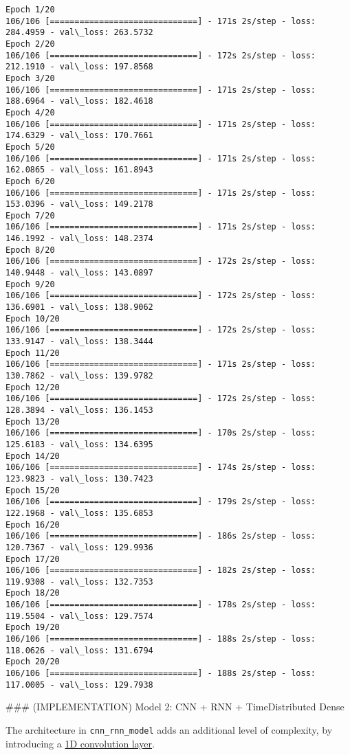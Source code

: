 \documentclass[11pt]{article}
\begin{document}
    \begin{Verbatim}[commandchars=\\\{\}]
Epoch 1/20
106/106 [==============================] - 171s 2s/step - loss: 284.4959 - val\_loss: 263.5732
Epoch 2/20
106/106 [==============================] - 172s 2s/step - loss: 212.1910 - val\_loss: 197.8568
Epoch 3/20
106/106 [==============================] - 171s 2s/step - loss: 188.6964 - val\_loss: 182.4618
Epoch 4/20
106/106 [==============================] - 171s 2s/step - loss: 174.6329 - val\_loss: 170.7661
Epoch 5/20
106/106 [==============================] - 171s 2s/step - loss: 162.0865 - val\_loss: 161.8943
Epoch 6/20
106/106 [==============================] - 171s 2s/step - loss: 153.0396 - val\_loss: 149.2178
Epoch 7/20
106/106 [==============================] - 171s 2s/step - loss: 146.1992 - val\_loss: 148.2374
Epoch 8/20
106/106 [==============================] - 172s 2s/step - loss: 140.9448 - val\_loss: 143.0897
Epoch 9/20
106/106 [==============================] - 172s 2s/step - loss: 136.6901 - val\_loss: 138.9062
Epoch 10/20
106/106 [==============================] - 172s 2s/step - loss: 133.9147 - val\_loss: 138.3444
Epoch 11/20
106/106 [==============================] - 171s 2s/step - loss: 130.7862 - val\_loss: 139.9782
Epoch 12/20
106/106 [==============================] - 172s 2s/step - loss: 128.3894 - val\_loss: 136.1453
Epoch 13/20
106/106 [==============================] - 170s 2s/step - loss: 125.6183 - val\_loss: 134.6395
Epoch 14/20
106/106 [==============================] - 174s 2s/step - loss: 123.9823 - val\_loss: 130.7423
Epoch 15/20
106/106 [==============================] - 179s 2s/step - loss: 122.1968 - val\_loss: 135.6853
Epoch 16/20
106/106 [==============================] - 186s 2s/step - loss: 120.7367 - val\_loss: 129.9936
Epoch 17/20
106/106 [==============================] - 182s 2s/step - loss: 119.9308 - val\_loss: 132.7353
Epoch 18/20
106/106 [==============================] - 178s 2s/step - loss: 119.5504 - val\_loss: 129.7574
Epoch 19/20
106/106 [==============================] - 188s 2s/step - loss: 118.0626 - val\_loss: 131.6794
Epoch 20/20
106/106 [==============================] - 188s 2s/step - loss: 117.0005 - val\_loss: 129.7938

    \end{Verbatim}

     \#\#\# (IMPLEMENTATION) Model 2: CNN + RNN + TimeDistributed Dense

The architecture in \texttt{cnn\_rnn\_model} adds an additional level of
complexity, by introducing a
\href{https://keras.io/layers/convolutional/\#conv1d}{1D convolution
layer}.
\end{document}
